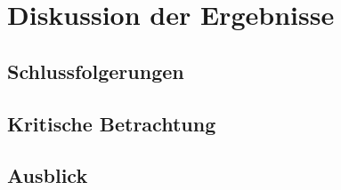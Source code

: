 \chapter{Diskussion der Ergebnisse}\label{chapter: Diskussion der Ergebnisse}

	\section{Schlussfolgerungen}\label{section: Schlussfolgerungen}
	
	\section{Kritische Betrachtung}
	
	\section{Ausblick}
